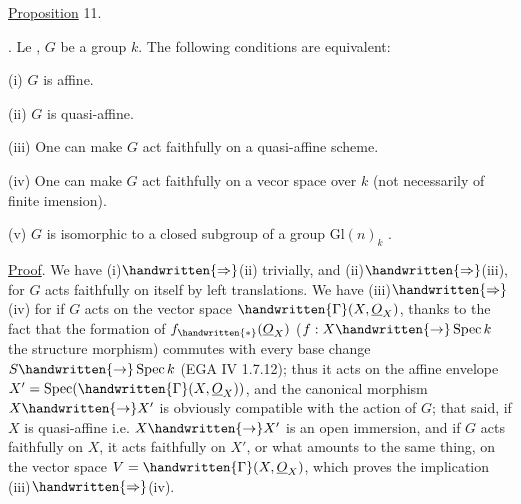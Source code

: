 \uline{Proposition} 11.. Le , $G$ be a group  $k$. The following conditions are equivalent:

(i) $G$ is affine.

(ii) $G$ is quasi-affine.

(iii) One can make $G$ act faithfully on a quasi-affine scheme.

(iv) One can make $G$ act faithfully on a vecor space over $k$ (not necessarily of finite imension).

(v)  $G$ is isomorphic to a closed subgroup of a group $\mathrm{Gl}(n)_k$ .

\uline{Proof}. We have (i)$\handwritten{\Rightarrow}$(ii) trivially, and (ii)$\handwritten{\Rightarrow}$(iii), for $G$ acts faithfully on itself by left translations. We have (iii)$\handwritten{\Rightarrow}$(iv) for if $G$ acts  on the vector space $\handwritten{\Gamma}(X,\underline{O}_X)$, thanks to the fact that the formation of $f_{\handwritten{*}}(\underline{O}_X)$ ($f:X\handwritten{\to}\operatorname{Spec}k$ the structure morphism) commutes with every base change $S\handwritten{\to}\operatorname{Spec}k$ (EGA IV 1.7.12); thus it acts on the affine envelope $X'=\operatorname{Spec}(\handwritten{\Gamma}(X,\underline{O}_X))$, and the canonical morphism $X\handwritten{\to}X'$ is obviously compatible with the action of $G$; that said, if $X$ is quasi-affine i.e. $X\handwritten{\to}X'$ is an open immersion, and if $G$ acts faithfully on $X$, it acts faithfully on $X'$, or what amounts to the same thing, on the vector space $V=\handwritten{\Gamma}(X,\underline{O}_X)$, which proves the implication (iii)$\handwritten{\Rightarrow}$(iv).

